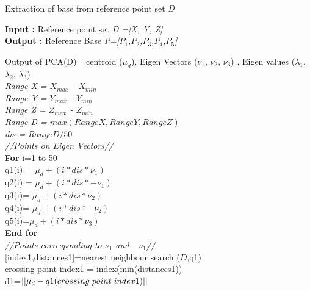 \documentclass[12pt]{article}
\begin{document}
 
\begin{algorithm}[H]
\caption{Extraction of base from reference point set \textit{D}}
\textbf{Input :} Reference point set \textit{D =[X, Y, Z]} \\
\textbf{Output :} Reference Base
\textit{P=[$P_1$,$P_2$,$P_3$,$P_4$,$P_5$]}\\
\vspace{0.25cm}

Output of PCA(D)= centroid ($\mu_d$), Eigen Vectors ($\nu_1$, $\nu_2$, $\nu_3$) , Eigen values ($\lambda_1$, $\lambda_2$, $\lambda_3$)\\
\vspace{0.25cm}
\textit{Range X = $X_{max}$ - $X_{min}$}\\
\textit{Range Y = $Y_{max}$ - $Y_{min}$}\\
\textit{Range Z = $Z_{max}$ - $Z_{min}$}\\
\textit{Range D = $max(Range X, Range Y, Range Z )$}\\
\textit{dis = $Range D / 50$}\\
\vspace{0.25cm}
\textit{//Points on Eigen Vectors//}\\
\vspace{0.15cm}
\textbf{For} i=1 to 50\\
\hspace{0.75cm}
q1(i) = $\mu_d + (i*dis*\nu_1)$\\
\hspace{0.75cm}
q2(i) = $\mu_d + (i*dis*-\nu_1)$\\
\hspace{0.75cm}
q3(i)= $\mu_d + (i*dis*\nu_2)$\\
\hspace{0.75cm}
q4(i)= $\mu_d + (i*dis*-\nu_2)$\\
\hspace{0.75cm}
q5(i)=$\mu_d + (i*dis*\nu_3)$\\
\textbf{End for}\\
\vspace{0.25cm}
\textit{//Points corresponding to $\nu_1$ and $-\nu_1$//}\\
\vspace{0.25cm}
[index1,distances1]=nearest neighbour search ($D$,q1)\\
crossing point index1 = index(min(distances1))\\
d1=$||\mu_d-q1(crossing \hspace{0.1cm} point\hspace{0.1cm} index1)||$\\

\end{algorithm}
\end{document}
